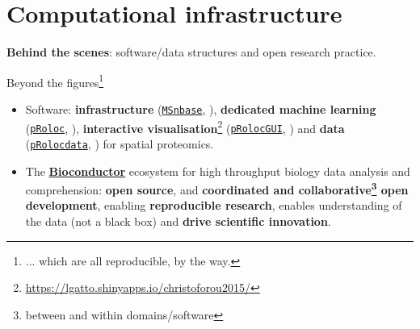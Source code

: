\section{Computational infrastructure}

\begin{frame}{}
  \begin{center}
    \Large{\textbf{Behind the scenes}: software/data structures and
      open research practice.}
  \end{center}
\end{frame}


\begin{frame}{}

  Beyond the figures\footnote{... which are all reproducible, by the way.}

  \begin{itemize}
  \item<+-> Software: \textbf{infrastructure}
    (\href{http://bioconductor.org/packages/MSnbase}{\texttt{MSnbase}},
    \cite{Gatto:2012}), \textbf{dedicated machine learning}
    (\href{http://bioconductor.org/packages/pRoloc}{\texttt{pRoloc}},
    \cite{Gatto:2014a}), \textbf{interactive
      visualisation}\footnote{\url{https://lgatto.shinyapps.io/christoforou2015/}}
    (\href{http://bioconductor.org/packages/pRolocGUI}{\texttt{pRolocGUI}},
    \cite{pRolocGUI}) and \textbf{data}
    (\href{http://bioconductor.org/packages/pRolocdata}{\texttt{pRolocdata}},
    \cite{Gatto:2014a}) for spatial proteomics.
  \item<+-> The \href{http://bioconductor.org/}{\textbf{Bioconductor}}
    \citep{Huber:2015} ecosystem for high throughput biology data
    analysis and comprehension: \textbf{open source}, and
    \textbf{coordinated and collaborative\footnote{between and within
        domains/software} open development}, enabling
    \textbf{reproducible research}, enables understanding of the data
    (not a black box) and \textbf{drive scientific innovation}.
  \end{itemize}
\end{frame}




